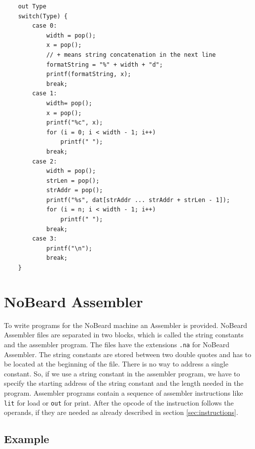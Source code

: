 	\begin{lstlisting}
	out Type
	switch(Type) {
		case 0:
			width = pop();
			x = pop();
			// + means string concatenation in the next line
			formatString = "%" + width + "d";
			printf(formatString, x);
			break;
		case 1:
			width= pop();
			x = pop();
			printf("%c", x);
			for (i = 0; i < width - 1; i++)
				printf(" ");
			break;
		case 2:
			width = pop();
			strLen = pop();
			strAddr = pop();
			printf("%s", dat[strAddr ... strAddr + strLen - 1]);
			for (i = n; i < width - 1; i++)
				printf(" ");
			break;
		case 3:
			printf("\n");
			break;
	}
	\end{lstlisting}
	
\section{NoBeard Assembler}
To write programs for the NoBeard machine an Assembler is provided. NoBeard Assembler files are separated in two blocks, which is called the string constants and the assembler program. The files have the extensions \lstinline$.na$ for NoBeard Assembler. The string constants are stored between two double quotes and has to be located at the beginning of the file. There is no way to address a single constant. So, if we use a string constant in the assembler program, we have to specify the starting address of the string constant and the length needed in the program. Assembler programs  contain a sequence of assembler instructions like \lstinline$lit$ for load or \lstinline$out$ for print. After the opcode of the instruction follows the operands, if they are needed as already described in section \ref{sec:instructions}.
\subsection{Example}

